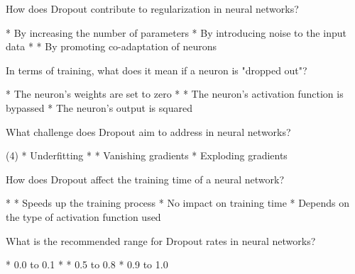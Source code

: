 \documentclass[10pt]{extarticle}
\begin{document}
\begin{exercise}
    How does Dropout contribute to regularization in neural networks?
    \begin{choice}
        * By increasing the number of parameters
        * By introducing noise to the input data
        * 
        * By promoting co-adaptation of neurons
    \end{choice}
\end{exercise}
\begin{solution}
\end{solution}

\begin{exercise}
    In terms of training, what does it mean if a neuron is "dropped out"?
    \begin{choice}
        * The neuron's weights are set to zero
        * 
        * The neuron's activation function is bypassed
        * The neuron's output is squared
    \end{choice}
\end{exercise}
\begin{solution}
\end{solution}

\begin{exercise}
    What challenge does Dropout aim to address in neural networks?
    \begin{choice} (4)
        * Underfitting
        * 
        * Vanishing gradients
        * Exploding gradients
    \end{choice}
\end{exercise}
\begin{solution}
\end{solution}

\begin{exercise}
    How does Dropout affect the training time of a neural network?
    \begin{choice}
        * 
        * Speeds up the training process
        * No impact on training time
        * Depends on the type of activation function used
    \end{choice}
\end{exercise}
\begin{solution}
\end{solution}

\begin{exercise}
    What is the recommended range for Dropout rates in neural networks?
    \begin{choice}
        * 0.0 to 0.1
        * 
        * 0.5 to 0.8
        * 0.9 to 1.0
    \end{choice}
\end{exercise}
\begin{solution}
\end{solution}
\end{document}
